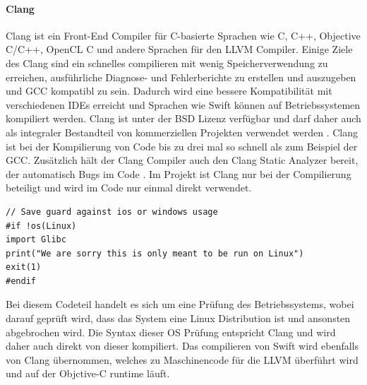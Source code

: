 \paragraph{Clang}
\label{para:clang}
Clang ist ein Front-End Compiler für C-basierte Sprachen wie C, C++, Objective C/C++, OpenCL C und andere Sprachen für den LLVM Compiler. Einige Ziele des Clang sind ein schnelles compilieren mit wenig Speicherverwendung zu erreichen, ausführliche Diagnose- und Fehlerberichte zu erstellen und auszugeben und GCC kompatibl zu sein. Dadurch wird eine bessere Kompatibilität mit verschiedenen IDEs erreicht und Sprachen wie Swift können auf Betriebssystemen kompiliert werden. Clang ist unter der BSD Lizenz verfügbar und darf daher auch als integraler Bestandteil von kommerziellen Projekten verwendet werden \parencite{clang}. Clang ist bei der Kompilierung von Code bis zu drei mal so schnell als zum Beispiel der GCC. Zusätzlich hält der Clang Compiler auch den Clang Static Analyzer bereit, der automatisch Bugs im Code \parencite{llvm}. Im Projekt ist Clang nur bei der Compilierung beteiligt und wird im Code nur einmal direkt verwendet. 

\lstset{caption=OS Prüfung, basicstyle=\small\ttfamily, label=lst:osprüfung, language=C}
\begin{lstlisting}
// Save guard against ios or windows usage
#if !os(Linux)
import Glibc
print("We are sorry this is only meant to be run on Linux")
exit(1)
#endif
\end{lstlisting}

Bei diesem Codeteil handelt es sich um eine Prüfung des Betriebssystems, wobei darauf geprüft wird, dass das System eine Linux Distribution ist und ansonsten abgebrochen wird. Die Syntax dieser OS Prüfung entspricht Clang und wird daher auch direkt von dieser kompiliert. Das compilieren von Swift wird ebenfalls von Clang übernommen, welches zu Maschinencode für die LLVM überführt wird und auf der Objctive-C runtime läuft.

